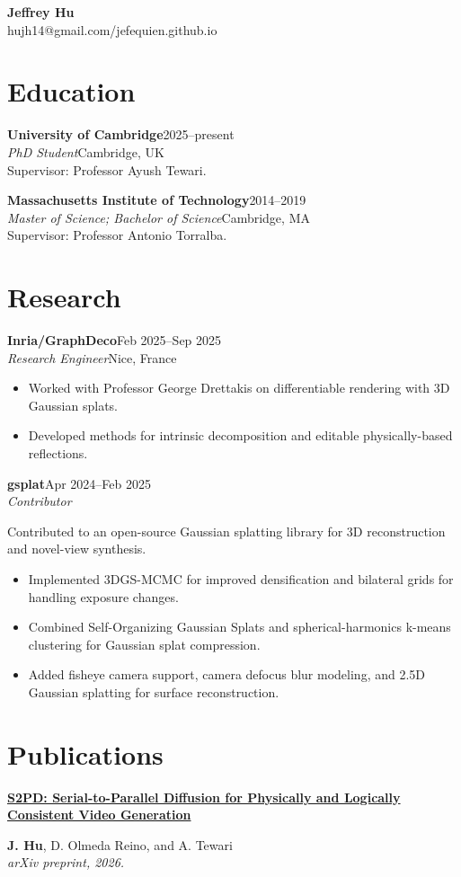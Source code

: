 \documentclass[11pt,a4paper]{article}
\newcommand{\entry}[4]{%
  \addvspace{2pt}%
  \textbf{#1}\hfill\textcolor{muted}{\small #2}\\
  \textit{#3}\hfill\textcolor{muted}{\small #4}\par
}
\newcommand{\educationentry}[5]{%
  \textbf{#1}\hfill\textcolor{muted}{\small #2}\\
  \textit{#3}\hfill\textcolor{muted}{\small #4}\\
  Supervisor: Professor #5.\par
}
\newcommand{\publication}[3]{%
  {\raggedright\hyphenpenalty=10000\textbf{#1}\par}
  {\small\color{muted}#2\\
  \textit{#3}\par}\vspace{3pt}
}
\begin{document}
{\fontsize{27}{30}\selectfont\textbf{Jeffrey Hu}}\\[3pt]
hujh14@gmail.com\enspace\textcolor{muted}{/}\enspace jefequien.github.io

\section{Education}
\educationentry{University of Cambridge}{2025--present}{PhD Student}{Cambridge, UK}{Ayush Tewari}
\vspace{5pt}
\educationentry{Massachusetts Institute of Technology}{2014--2019}
{Master of Science; Bachelor of Science}{Cambridge, MA}{Antonio Torralba}

\section{Research}
\entry{Inria/GraphDeco}{Feb 2025--Sep 2025}{Research Engineer}{Nice, France}
\begin{itemize}
  \item Worked with Professor George Drettakis on differentiable rendering with 3D Gaussian splats.
  \item Developed methods for intrinsic decomposition and editable physically-based reflections.
\end{itemize}

\entry{gsplat}{Apr 2024--Feb 2025}{Contributor}{}
Contributed to an open-source Gaussian splatting library for 3D reconstruction and novel-view synthesis.
\begin{itemize}
  \item Implemented 3DGS-MCMC for improved densification and bilateral grids for handling exposure changes.
  \item Combined Self-Organizing Gaussian Splats and spherical-harmonics k-means clustering
  for Gaussian splat compression.
  \item Added fisheye camera support, camera defocus blur modeling, and 2.5D Gaussian splatting
  for surface reconstruction.
\end{itemize}

\section{Publications}
\publication
{\href{https://arxiv.org/abs/2610.06847}{S2PD: Serial-to-Parallel Diffusion for Physically and Logically Consistent Video Generation}}
{\textbf{J. Hu}, D. Olmeda Reino, and A. Tewari}
{arXiv preprint, 2026.}
\end{document}

